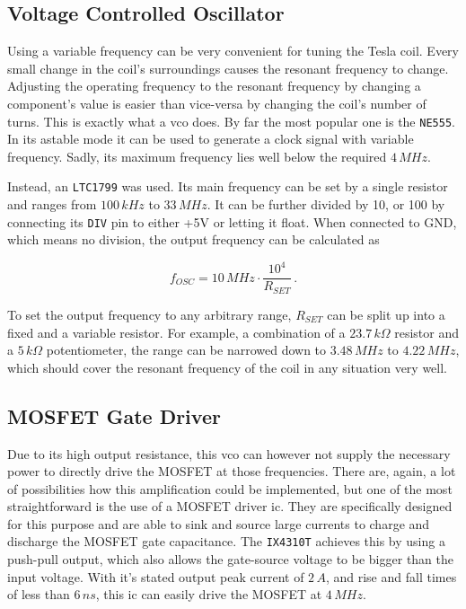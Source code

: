 \subsection{Voltage Controlled Oscillator}

Using a variable frequency can be very convenient for tuning the Tesla coil. Every small change in the coil's surroundings causes the resonant frequency to change. Adjusting the operating frequency to the resonant frequency by changing a component's value is easier than vice-versa by changing the coil's number of turns. This is exactly what a \gls{vco} does. By far the most popular one is the \texttt{NE555}. In its astable mode it can be used to generate a clock signal with variable frequency. Sadly, its maximum frequency lies well below the required \(4\,MHz\).

Instead, an \texttt{LTC1799} was used. Its main frequency can be set by a single resistor and ranges from \(100\,kHz\) to \(33\,MHz\). It can be further divided by 10, or 100 by connecting its \texttt{DIV} pin to either +5V or letting it float. When connected to GND, which means no division, the output frequency can be calculated as

\begin{equation}
    f_{OSC} = 10\,MHz \cdot \frac{10^4}{R_{SET}}\,.
\end{equation}

To set the output frequency to any arbitrary range, \(R_{SET}\) can be split up into a fixed and a variable resistor. For example, a combination of a \(23.7\,k\Omega\) resistor and a \(5\,k\Omega\) potentiometer, the range can be narrowed down to \(3.48\,MHz\) to \(4.22\,MHz\), which should cover the resonant frequency of the coil in any situation very well.

\subsection{MOSFET Gate Driver}

Due to its high output resistance, this \gls{vco} can however not supply the necessary power to directly drive the MOSFET at those frequencies. There are, again, a lot of possibilities how this amplification could be implemented, but one of the most straightforward is the use of a MOSFET driver \gls{ic}. They are specifically designed for this purpose and are able to sink and source large currents to charge and discharge the MOSFET gate capacitance. The \texttt{IX4310T} achieves this by using a push-pull output, which also allows the gate-source voltage to be bigger than the input voltage. With it's stated output peak current of \(2\,A\), and rise and fall times of less than \(6\,ns\), this \gls{ic} can easily drive the MOSFET at \(4\,MHz\).


